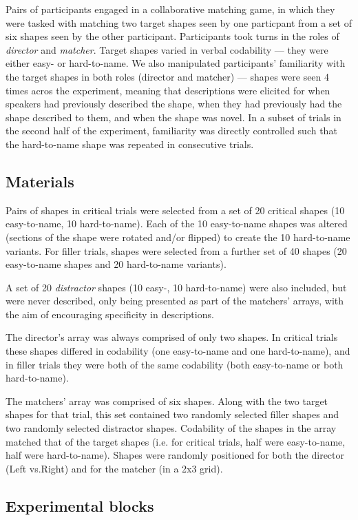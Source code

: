 \documentclass[a4paper,man,natbib]{apa6}
\newcommand*{\term}[1]{\emph{#1}} %
\begin{document}
Pairs of participants engaged in a collaborative matching game, in which they were tasked with matching two target shapes seen by one particpant from a set of six shapes seen by the other participant. 
Participants took turns in the roles of \term{director} and \term{matcher}.
Target shapes varied in verbal codability --- they were either easy- or hard-to-name.
We also manipulated participants' familiarity with the target shapes in both roles (director and matcher) --- shapes were seen 4 times acros the experiment, meaning that descriptions were elicited for when speakers had previously described the shape, when they had previously had the shape described to them, and when the shape was novel. 
In a subset of trials in the second half of the experiment, familiarity was directly controlled such that the hard-to-name shape was repeated in consecutive trials. 


\subsection{Materials}
Pairs of shapes in critical trials were selected from a set of 20 critical shapes (10 easy-to-name, 10 hard-to-name).
Each of the 10 easy-to-name shapes was altered (sections of the shape were rotated and/or flipped) to create the 10 hard-to-name variants. %
For filler trials, shapes were selected from a further set of 40 shapes (20 easy-to-name shapes and 20 hard-to-name variants). 

A set of 20 \term{distractor} shapes (10 easy-, 10 hard-to-name) were also included, but were never described, only being presented as part of the matchers' arrays, with the aim of encouraging specificity in descriptions.

The director's array was always comprised of only two shapes.
In critical trials these shapes differed in codability (one easy-to-name and one hard-to-name), and in filler trials they were both of the same codability (both easy-to-name or both hard-to-name).

The matchers' array was comprised of six shapes.
Along with the two target shapes for that trial, this set contained two randomly selected filler shapes and two randomly selected distractor shapes. 
Codability of the shapes in the array matched that of the target shapes (i.e. for critical trials, half were easy-to-name, half were hard-to-name).
Shapes were randomly positioned for both the director (Left vs.\@ Right) and for the matcher (in a 2x3 grid).


\subsection{Experimental blocks}
\end{document}
